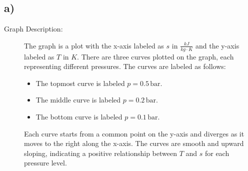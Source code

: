 

\subsection*{a)}

\begin{description}
    \item[Graph Description:] The graph is a plot with the x-axis labeled as $s$ in $\frac{kJ}{kg \cdot K}$ and the y-axis labeled as $T$ in $K$. There are three curves plotted on the graph, each representing different pressures. The curves are labeled as follows:
    \begin{itemize}
        \item The topmost curve is labeled $p = 0.5 \, \text{bar}$.
        \item The middle curve is labeled $p = 0.2 \, \text{bar}$.
        \item The bottom curve is labeled $p = 0.1 \, \text{bar}$.
    \end{itemize}
    Each curve starts from a common point on the y-axis and diverges as it moves to the right along the x-axis. The curves are smooth and upward sloping, indicating a positive relationship between $T$ and $s$ for each pressure level.
\end{description}